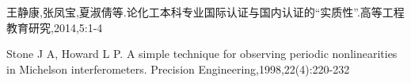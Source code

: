 \documentclass[11pt,a4paper]{article}
\newcommand{\wuhao}{\fontsize{10.5pt}{18pt}\selectfont}
\newcommand\seccontent{
	\wuhao %
    \setlength{\parindent}{2em} %
    \setlength{\parskip}{0pt}
    }
\theoremstyle{definition} \newtheorem{law}[thm]{Law}
\theoremstyle{plain} \newtheorem{jury}[thm]{Jury}
\theoremstyle{remark} \newtheorem*{marg}{Margaret}
\numberwithin{equation}{section}
\begin{document}
	\appendix
    \label{bibtexref}
		
	\begin{thebibliography}{1}
		\label{latexref}		
	  \seccontent
	   王静康,张凤宝,夏淑倩等.论化工本科专业国际认证与国内认证的“实质性”.高等工程教育研究,2014,5:1-4
		
		 Stone J A, Howard L P. A simple technique for observing periodic nonlinearities in Michelson interferometers. Precision Engineering,1998,22(4):220-232

	\end{thebibliography}
%	
\end{document}
